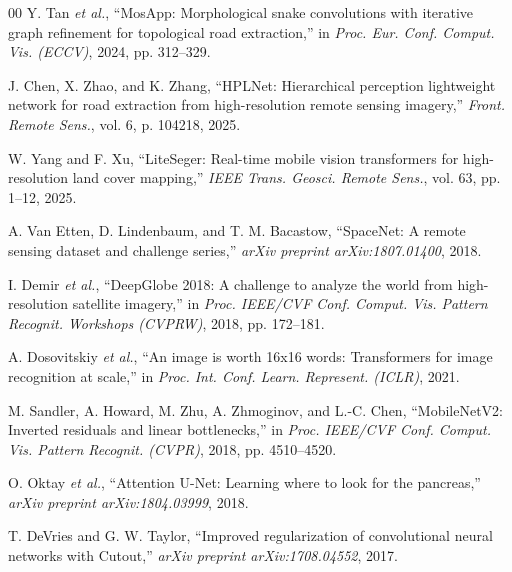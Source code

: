\documentclass[conference]{IEEEtran}
\begin{document}
\begin{thebibliography}{00}
 Y. Tan \textit{et al.}, ``MosApp: Morphological snake convolutions with iterative graph refinement for topological road extraction,'' in \textit{Proc. Eur. Conf. Comput. Vis. (ECCV)}, 2024, pp. 312--329.

 J. Chen, X. Zhao, and K. Zhang, ``HPLNet: Hierarchical perception lightweight network for road extraction from high-resolution remote sensing imagery,'' \textit{Front. Remote Sens.}, vol. 6, p. 104218, 2025.

 W. Yang and F. Xu, ``LiteSeger: Real-time mobile vision transformers for high-resolution land cover mapping,'' \textit{IEEE Trans. Geosci. Remote Sens.}, vol. 63, pp. 1--12, 2025.

 A. Van Etten, D. Lindenbaum, and T. M. Bacastow, ``SpaceNet: A remote sensing dataset and challenge series,'' \textit{arXiv preprint arXiv:1807.01400}, 2018.

 I. Demir \textit{et al.}, ``DeepGlobe 2018: A challenge to analyze the world from high-resolution satellite imagery,'' in \textit{Proc. IEEE/CVF Conf. Comput. Vis. Pattern Recognit. Workshops (CVPRW)}, 2018, pp. 172--181.

 A. Dosovitskiy \textit{et al.}, ``An image is worth 16x16 words: Transformers for image recognition at scale,'' in \textit{Proc. Int. Conf. Learn. Represent. (ICLR)}, 2021.

 M. Sandler, A. Howard, M. Zhu, A. Zhmoginov, and L.-C. Chen, ``MobileNetV2: Inverted residuals and linear bottlenecks,'' in \textit{Proc. IEEE/CVF Conf. Comput. Vis. Pattern Recognit. (CVPR)}, 2018, pp. 4510--4520.

 O. Oktay \textit{et al.}, ``Attention U-Net: Learning where to look for the pancreas,'' \textit{arXiv preprint arXiv:1804.03999}, 2018.

 T. DeVries and G. W. Taylor, ``Improved regularization of convolutional neural networks with Cutout,'' \textit{arXiv preprint arXiv:1708.04552}, 2017.

\end{thebibliography}

\appendices
\end{document}
